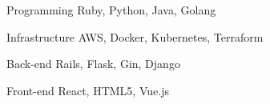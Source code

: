 
\begin{cvskills}
  \cvskill
    {Programming} %
    {Ruby, Python, Java, Golang} %

  \cvskill
    {Infrastructure} %
    {AWS, Docker, Kubernetes, Terraform} %

  \cvskill
    {Back-end} %
    {Rails, Flask, Gin, Django } %

  \cvskill
    {Front-end} %
    {React, HTML5, Vue.js} %


\end{cvskills}